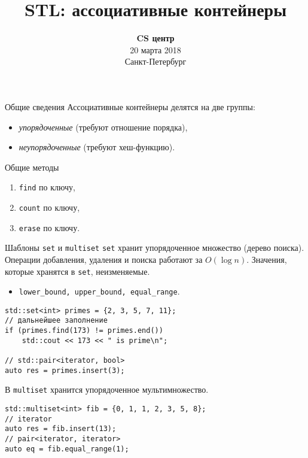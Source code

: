 \documentclass{beamer}
\title{STL: ассоциативные контейнеры}
\date{
   \textbf{CS центр}\\
   20 марта 2018 \\
   Санкт-Петербург
}
\begin{document}
\begin{frame} 
  \titlepage
\end{frame}

\begin{frame}[fragile]{Общие сведения}
Ассоциативные контейнеры делятся на две группы:
\begin{itemize}
\item \textit{упорядоченные} (требуют отношение порядка), 
\item \textit{неупорядоченные} (требуют хеш-функцию).
\end{itemize}
\begin{block}{Общие методы}
\begin{enumerate}
    \item {\tt find} по ключу,
    \item {\tt count} по ключу,
    \item {\tt erase} по ключу.
\end{enumerate}
\end{block}
\end{frame}

\begin{frame}[fragile]{Шаблоны {\tt set} и {\tt multiset}}
\texttt{set} хранит упорядоченное множество (дерево поиска).\\ 
Операции добавления, удаления и поиска работают за $O(\log n)$.
Значения, которые хранятся в \texttt{set}, неизменяемые.
\begin{itemize}
    \item {\tt lower\_bound, upper\_bound, equal\_range}.
\end{itemize}

\begin{lstlisting}
std::set<int> primes = {2, 3, 5, 7, 11};
// дальнейшее заполнение
if (primes.find(173) != primes.end())
    std::cout << 173 << " is prime\n";
    
// std::pair<iterator, bool>
auto res = primes.insert(3);
\end{lstlisting}
В \texttt{multiset} хранится упорядоченное мультимножество.
\vspace{-1mm}
\begin{lstlisting}
std::multiset<int> fib = {0, 1, 1, 2, 3, 5, 8};
// iterator
auto res = fib.insert(13);
// pair<iterator, iterator>
auto eq = fib.equal_range(1);
\end{lstlisting}
\end{frame}
\end{document}
